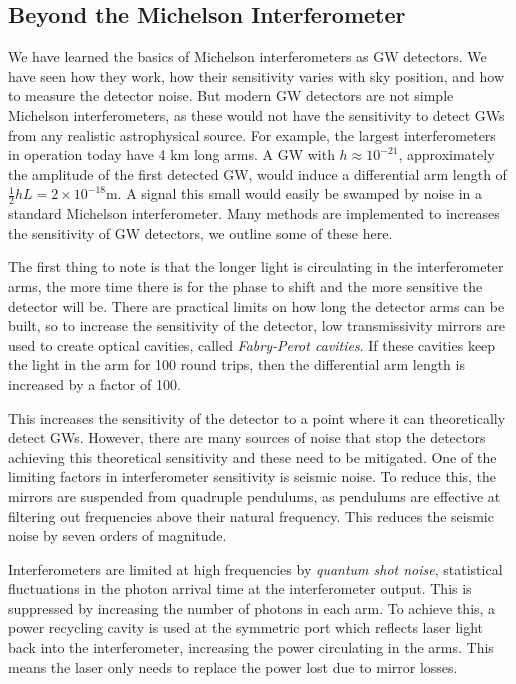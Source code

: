 \documentclass[11pt]{cuthesis}
\begin{document}
\subsection{Beyond the Michelson Interferometer}
We have learned the basics of Michelson interferometers as GW detectors. We have seen how they work, how their sensitivity varies with sky position, and how to measure the detector noise. But modern GW detectors are not simple Michelson interferometers, as these would not have the sensitivity to detect GWs from any realistic astrophysical source. For example, the largest interferometers in operation today have 4 km long arms. A GW with $h\approx 10^{-21}$, approximately the amplitude of the first detected GW, would induce a differential arm length of $\frac{1}{2} h L = 2\times 10^{-18}$m. A signal this small would easily be swamped by noise in a standard Michelson interferometer. Many methods are implemented to increases the sensitivity of GW detectors, we outline some of these here.

The first thing to note is that the longer light is circulating in the interferometer arms, the more time there is for the phase to shift and the more sensitive the detector will be. There are practical limits on how long the detector arms can be built, so to increase the sensitivity of the detector, low transmissivity mirrors are used to create optical cavities, called \textit{Fabry-Perot cavities}. If these cavities keep the light in the arm for 100 round trips, then the differential arm length is increased by a factor of 100.\cite{lrr-2009-2}

This increases the sensitivity of the detector to a point where it can theoretically detect GWs. However, there are many sources of noise that stop the detectors achieving this theoretical sensitivity and these need to be mitigated. One of the limiting factors in interferometer sensitivity is seismic noise. To reduce this, the mirrors are suspended from quadruple pendulums, as pendulums are effective at filtering out frequencies above their natural frequency. This reduces the seismic noise by seven orders of magnitude. \cite{GW150914-detector}

Interferometers are limited at high frequencies by \textit{quantum shot noise}, statistical fluctuations in the photon arrival time at the interferometer output. This is suppressed by increasing the number of photons in each arm. To achieve this, a power recycling cavity is used at the symmetric port which reflects laser light back into the interferometer, increasing the power circulating in the arms. This means the laser only needs to replace the power lost due to mirror losses. \cite{lrr-2009-2}
\end{document}
